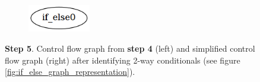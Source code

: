 \begin{figure}[htbp]
\begin{subfigure}[t]{0.45\textwidth}
	\end{subfigure}
	\qquad
	\begin{subfigure}[t]{0.45\textwidth}
		\centering
		\includegraphics[width=0.3\textwidth]{appendices/stmt_example/stmt_5.png}
	\end{subfigure}
	\caption{\textbf{Step 5}. Control flow graph from \textbf{step 4} (left) and simplified control flow graph (right) after identifying 2-way conditionals (see figure \ref{fig:if_else_graph_representation}).}
	\label{fig:step_5}
\end{figure}
